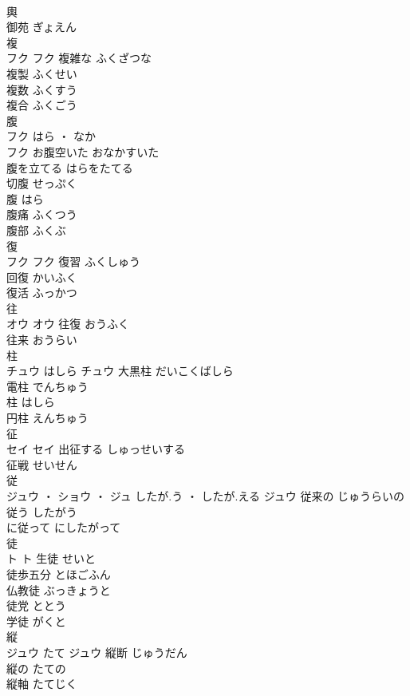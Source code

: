 \documentclass[8pt]{extreport}
\begin{document}
\begin{CJK}{UTF8}{min}
\\	輿 
\\	御苑	ぎょえん	
\\	複	
\\	フク		フク	複雑な	ふくざつな	
\\	複製	ふくせい	
\\	複数	ふくすう	
\\	複合	ふくごう	
\\	腹	
\\	フク	はら ・ なか
\\	フク	お腹空いた	おなかすいた	
\\	腹を立てる	はらをたてる	
\\	切腹	せっぷく	
\\	腹	はら	
\\	腹痛	ふくつう	
\\	腹部	ふくぶ	
\\	復	
\\	フク		フク	復習	ふくしゅう	
\\	回復	かいふく	
\\	復活	ふっかつ	
\\	往	
\\	オウ		オウ	往復	おうふく	
\\	往来	おうらい	
\\	柱	
\\	チュウ	はしら	チュウ	大黒柱	だいこくばしら	
\\	電柱	でんちゅう	
\\	柱	はしら	
\\	円柱	えんちゅう	
\\	征	
\\	セイ		セイ	出征する	しゅっせいする	
\\	征戦	せいせん	
\\	従	
\\	ジュウ ・ ショウ ・ ジュ	したが.う ・ したが.える	ジュウ	従来の	じゅうらいの	
\\	従う	したがう	
\\	に従って	にしたがって	
\\	徒	
\\	ト		ト	生徒	せいと	
\\	徒歩五分	とほごふん	
\\	仏教徒	ぶっきょうと	
\\	徒党	ととう	
\\	学徒	がくと	
\\	縦	
\\	ジュウ	たて	ジュウ	縦断	じゅうだん	
\\	縦の	たての	
\\	縦軸	たてじく	

\end{CJK}
\end{document}
